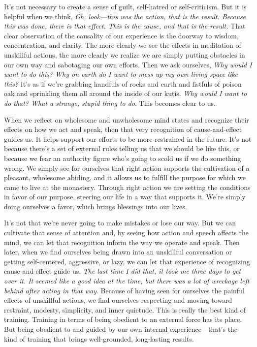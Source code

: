 It's not necessary to create a sense of guilt, self-hatred or 
self-criticism. But it is helpful when we think, \emph{Oh, look---this 
was the action, that is the result. Because this was done, there is 
that effect. This is the cause, and that is the result.} That clear 
observation of the causality of our experience is the doorway to 
wisdom, concentration, and clarity. The more clearly we see the effects 
in meditation of unskillful actions, the more clearly we realize we are 
simply putting obstacles in our own way and sabotaging our own efforts. 
Then we ask ourselves, \emph{Why would I want to do this? Why on earth 
do I want to mess up my own living space like this?} It's as if we're 
grabbing handfuls of rocks and earth and fistfuls of poison oak and 
sprinkling them all around the inside of our kuṭis. \emph{Why would I 
want to do that? What a strange, stupid thing to do}. This becomes 
clear to us.

When we reflect on wholesome and unwholesome mind states and recognize 
their effects on how we act and speak, then that very recognition of 
cause-and-effect guides us. It helps support our efforts to be more 
restrained in the future. It's not because there's a set of external 
rules telling us that we should be like this, or because we fear an 
authority figure who's going to scold us if we do something wrong. We 
simply see for ourselves that right action supports the cultivation of 
a pleasant, wholesome abiding, and it allows us to fulfill the purpose 
for which we came to live at the monastery. Through right action we are 
setting the conditions in favor of our purpose, steering our life in a 
way that supports it. We're simply doing ourselves a favor, which 
brings blessings into our lives.

It's not that we're never going to make mistakes or lose our way. But 
we can cultivate that sense of attention and, by seeing how action and 
speech affects the mind, we can let that recognition inform the way we 
operate and speak. Then later, when we find ourselves being drawn into 
an unskillful conversation or getting self-centered, aggressive, or 
lazy, we can let that experience of recognizing cause-and-effect guide 
us. \emph{The last time I did that, it took me three days to get over 
it. It seemed like a good idea at the time, but there was a lot of 
wreckage left behind after acting in that way}. Because of having seen 
for ourselves the painful effects of unskillful actions, we find 
ourselves respecting and moving toward restraint, modesty, simplicity, 
and inner quietude. This is really the best kind of training. Training 
in terms of being obedient to an external force has its place. But 
being obedient to and guided by our own internal experience---that's 
the kind of training that brings well-grounded, long-lasting results.

